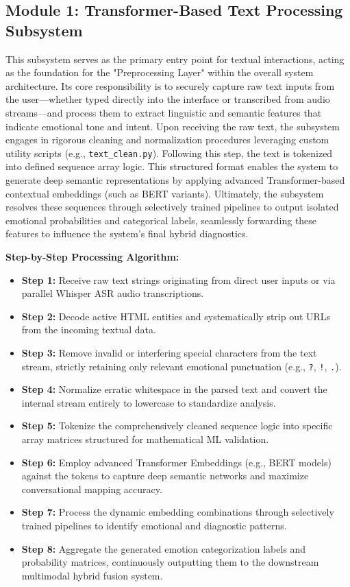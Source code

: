 \documentclass[11pt]{report}
\begin{document}
\subsection{Module 1: Transformer-Based Text Processing Subsystem}
This subsystem serves as the primary entry point for textual interactions, acting as the foundation for the "Preprocessing Layer" within the overall system architecture. Its core responsibility is to securely capture raw text inputs from the user—whether typed directly into the interface or transcribed from audio streams—and process them to extract linguistic and semantic features that indicate emotional tone and intent. Upon receiving the raw text, the subsystem engages in rigorous cleaning and normalization procedures leveraging custom utility scripts (e.g., \texttt{text\_clean.py}). Following this step, the text is tokenized into defined sequence array logic. This structured format enables the system to generate deep semantic representations by applying advanced Transformer-based contextual embeddings (such as BERT variants). Ultimately, the subsystem resolves these sequences through selectively trained pipelines to output isolated emotional probabilities and categorical labels, seamlessly forwarding these features to influence the system's final hybrid diagnostics.

\vspace{0.3cm}
\textbf{Step-by-Step Processing Algorithm:}
\begin{itemize}
    \item \textbf{Step 1:} Receive raw text strings originating from direct user inputs or via parallel Whisper ASR audio transcriptions.
    \item \textbf{Step 2:} Decode active HTML entities and systematically strip out URLs from the incoming textual data.
    \item \textbf{Step 3:} Remove invalid or interfering special characters from the text stream, strictly retaining only relevant emotional punctuation (e.g., \texttt{?}, \texttt{!}, \texttt{.}).
    \item \textbf{Step 4:} Normalize erratic whitespace in the parsed text and convert the internal stream entirely to lowercase to standardize analysis.
    \item \textbf{Step 5:} Tokenize the comprehensively cleaned sequence logic into specific array matrices structured for mathematical ML validation.
    \item \textbf{Step 6:} Employ advanced Transformer Embeddings (e.g., BERT models) against the tokens to capture deep semantic networks and maximize conversational mapping accuracy.
    \item \textbf{Step 7:} Process the dynamic embedding combinations through selectively trained pipelines to identify emotional and diagnostic patterns.
    \item \textbf{Step 8:} Aggregate the generated emotion categorization labels and probability matrices, continuously outputting them to the downstream multimodal hybrid fusion system.
\end{itemize}
\end{document}
